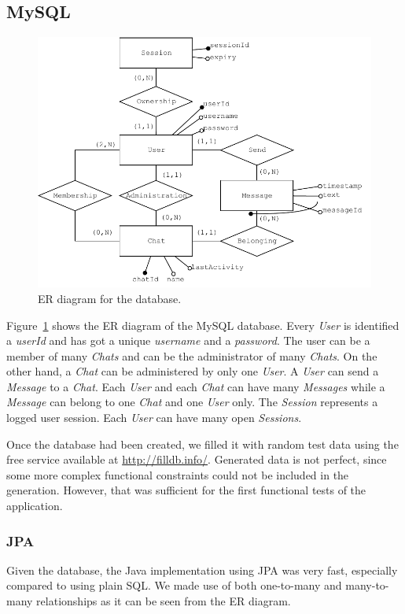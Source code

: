 \documentclass[10pt]{article}
\begin{document}
\subsection{MySQL}
\begin{figure}[]
    \centering
    \includegraphics[width=\textwidth]{figs/ER}
    \caption{ER diagram for the database.}
    \label{fig:er}
\end{figure}

Figure~\ref{fig:er} shows the ER diagram of the MySQL database. Every \emph{User} 
is identified a \emph{userId} and has got a unique \emph{username} and a 
\emph{password}. The user can be a member of many \emph{Chats} and can 
be the administrator of many \emph{Chats}. On the other hand, a \emph{Chat} 
can be administered by only one \emph{User}. A \emph{User} can send a 
\emph{Message} to a \emph{Chat}. Each \emph{User} and each \emph{Chat} can 
have many \emph{Messages} while a \emph{Message} can belong to one \emph{Chat}
and one \emph{User} only. The \emph{Session} represents a logged user session.
Each \emph{User} can have many open \emph{Sessions}.

Once the database had been created, we filled it with random test data using the free
service available at \url{http://filldb.info/}. Generated data is not perfect, 
since some more complex functional constraints could not be included in the 
generation. However, that was sufficient for the first functional tests of the
application.

\subsubsection{JPA}
Given the database, the Java implementation using JPA was very fast, especially
compared to using plain SQL. We made use of both one-to-many and many-to-many 
relationships as it can be seen from the ER diagram.
\end{document}
